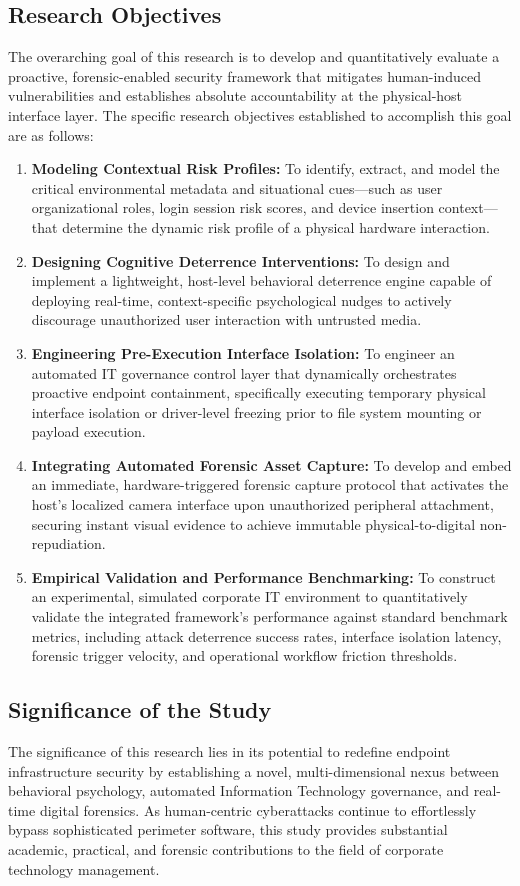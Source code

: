 \documentclass{ieeeaccess}
\begin{document}
\subsection{Research Objectives}
The overarching goal of this research is to develop and quantitatively evaluate a proactive, forensic-enabled security framework that mitigates human-induced vulnerabilities and establishes absolute accountability at the physical-host interface layer. The specific research objectives established to accomplish this goal are as follows:
\begin{enumerate}
    \item \textbf{Modeling Contextual Risk Profiles:} To identify, extract, and model the critical environmental metadata and situational cues—such as user organizational roles, login session risk scores, and device insertion context—that determine the dynamic risk profile of a physical hardware interaction.
    \item \textbf{Designing Cognitive Deterrence Interventions:} To design and implement a lightweight, host-level behavioral deterrence engine capable of deploying real-time, context-specific psychological nudges to actively discourage unauthorized user interaction with untrusted media.
    \item \textbf{Engineering Pre-Execution Interface Isolation:} To engineer an automated IT governance control layer that dynamically orchestrates proactive endpoint containment, specifically executing temporary physical interface isolation or driver-level freezing prior to file system mounting or payload execution.
    \item \textbf{Integrating Automated Forensic Asset Capture:} To develop and embed an immediate, hardware-triggered forensic capture protocol that activates the host's localized camera interface upon unauthorized peripheral attachment, securing instant visual evidence to achieve immutable physical-to-digital non-repudiation.
    \item \textbf{Empirical Validation and Performance Benchmarking:} To construct an experimental, simulated corporate IT environment to quantitatively validate the integrated framework's performance against standard benchmark metrics, including attack deterrence success rates, interface isolation latency, forensic trigger velocity, and operational workflow friction thresholds.
\end{enumerate}


\subsection{Significance of the Study}
The significance of this research lies in its potential to redefine endpoint infrastructure security by establishing a novel, multi-dimensional nexus between behavioral psychology, automated Information Technology governance, and real-time digital forensics. As human-centric cyberattacks continue to effortlessly bypass sophisticated perimeter software, this study provides substantial academic, practical, and forensic contributions to the field of corporate technology management.
\end{document}
